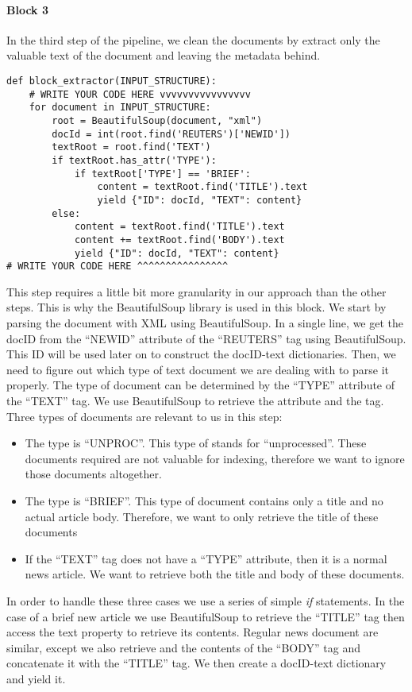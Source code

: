 \documentclass[]{report}
\begin{document}
\paragraph{Block 3}
In the third step of the pipeline, we clean the documents by extract only the valuable text of the document and leaving the metadata behind.
\begin{verbatim}
def block_extractor(INPUT_STRUCTURE):
	# WRITE YOUR CODE HERE vvvvvvvvvvvvvvvv
	for document in INPUT_STRUCTURE:
		root = BeautifulSoup(document, "xml")
		docId = int(root.find('REUTERS')['NEWID'])
		textRoot = root.find('TEXT')
		if textRoot.has_attr('TYPE'):
			if textRoot['TYPE'] == 'BRIEF':
				content = textRoot.find('TITLE').text
				yield {"ID": docId, "TEXT": content}
		else:
			content = textRoot.find('TITLE').text
			content += textRoot.find('BODY').text
			yield {"ID": docId, "TEXT": content}
# WRITE YOUR CODE HERE ^^^^^^^^^^^^^^^^
\end{verbatim}
This step requires a little bit more granularity in our approach than the other steps. This is why the BeautifulSoup library is used in this block. We start by parsing the document with XML using BeautifulSoup. In a single line, we get the docID from the ``NEWID'' attribute of the ``REUTERS'' tag using BeautifulSoup. This ID will be used later on to construct the docID-text dictionaries. Then, we need to figure out which type of text document we are dealing with to parse it properly. The type of document can be determined by the ``TYPE'' attribute of the ``TEXT'' tag. We use BeautifulSoup to retrieve the attribute and the tag. Three types of documents are relevant to us in this step:
\begin{itemize}
	\item The type is ``UNPROC''. This type of stands for ``unprocessed''. These documents required are not valuable for indexing, therefore we want to ignore those documents altogether.
	\item The type is ``BRIEF''. This type of document contains only a title and no actual article body. Therefore, we want to only retrieve the title of these documents
	\item If the ``TEXT'' tag does not have a ``TYPE'' attribute, then it is a normal news article. We want to retrieve both the title and body of these documents.
\end{itemize}
In order to handle these three cases we use a series of simple \textit{if} statements. In the case of a brief new article we use BeautifulSoup to retrieve the ``TITLE'' tag then access the text property to retrieve its contents. Regular news document are similar, except we also retrieve and the contents of the ``BODY'' tag and concatenate it with the ``TITLE'' tag. We then create a docID-text dictionary and yield it.
\end{document}
